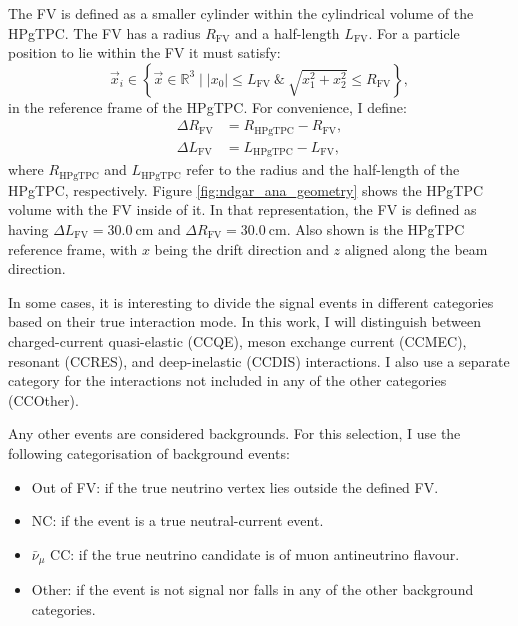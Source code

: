 The FV is defined as a smaller cylinder within the cylindrical volume of the HPgTPC. The FV has a radius $R_{\mathrm{FV}}$ and a half-length $L_{\mathrm{FV}}$. For a particle position to lie within the FV it must satisfy:
\begin{equation}
    \vec{x}_{i} \in \left\{\vec{x} \in \mathbb{R}^{3} \mid |x_{0}| \leq L_{\mathrm{FV}} ~ \& ~ \sqrt{x_{1}^{2}+x_{2}^{2}} \leq R_{\mathrm{FV}}\right\},
\end{equation}
in the reference frame of the HPgTPC. For convenience, I define:
\begin{equation}
    \begin{split}
        \Delta R_{\mathrm{FV}} &= R_{\mathrm{HPgTPC}} - R_{\mathrm{FV}}, \\
        \Delta L_{\mathrm{FV}} &= L_{\mathrm{HPgTPC}} - L_{\mathrm{FV}},
    \end{split}
\end{equation}
where $R_{\mathrm{HPgTPC}}$ and $L_{\mathrm{HPgTPC}}$ refer to the radius and the half-length of the HPgTPC, respectively. Figure \ref{fig:ndgar_ana_geometry} shows the HPgTPC volume with the FV inside of it. In that representation, the FV is defined as having $\Delta L_{\mathrm{FV}} = 30.0 ~ \mathrm{cm}$ and $\Delta R_{\mathrm{FV}} = 30.0 ~ \mathrm{cm}$. Also shown is the HPgTPC reference frame, with $x$ being the drift direction and $z$ aligned along the beam direction.

In some cases, it is interesting to divide the signal events in different categories based on their true interaction mode. In this work, I will distinguish between charged-current quasi-elastic (CCQE), meson exchange current (CCMEC), resonant (CCRES), and deep-inelastic (CCDIS) interactions. I also use a separate category for the interactions not included in any of the other categories (CCOther).

Any other events are considered backgrounds. For this selection, I use the following categorisation of background events:
\begin{itemize}
    \item Out of FV: if the true neutrino vertex lies outside the defined FV.
    \item NC: if the event is a true neutral-current event.
    \item $\bar{\nu}_{\mu}$ CC: if the true neutrino candidate is of muon antineutrino flavour.
    \item Other: if the event is not signal nor falls in any of the other background categories.
\end{itemize}

